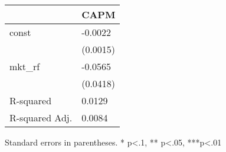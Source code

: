 \begin{table}
\caption{}
\label{}
\begin{center}
\begin{tabular}{ll}
\hline
               & CAPM      \\
\hline
const          & -0.0022   \\
               & (0.0015)  \\
mkt\_rf        & -0.0565   \\
               & (0.0418)  \\
R-squared      & 0.0129    \\
R-squared Adj. & 0.0084    \\
\hline
\end{tabular}
\end{center}
\end{table}
\bigskip
Standard errors in parentheses. \newline 
* p<.1, ** p<.05, ***p<.01